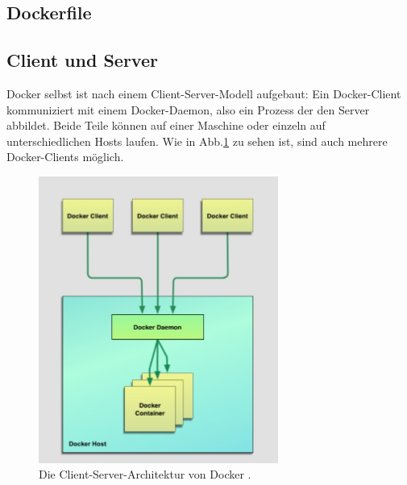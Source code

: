 \documentclass[11pt,a4paper,oneside]{report}
\newcommand{\fig}{Abb.}
\begin{document}



    \subsection{Dockerfile}


    \subsection{Client und Server}
      Docker selbst ist nach einem Client-Server-Modell aufgebaut: Ein Docker-Client kommuniziert mit einem Docker-Daemon, also ein Prozess der den Server abbildet. Beide Teile können auf einer Maschine oder einzeln auf unterschiedlichen Hosts laufen. Wie in \fig \ref{fig:intro_dockerArchitecture} zu sehen ist, sind auch mehrere Docker-Clients möglich.

      \begin{figure}[h]
          \centering
          \includegraphics[width=0.7\textwidth]{./images/intro_dockerArchitecture.jpg}
          \caption{Die Client-Server-Architektur von Docker \cite[S.10]{dockerBook}.}
          \label{fig:intro_dockerArchitecture}
      \end{figure}
\end{document}

